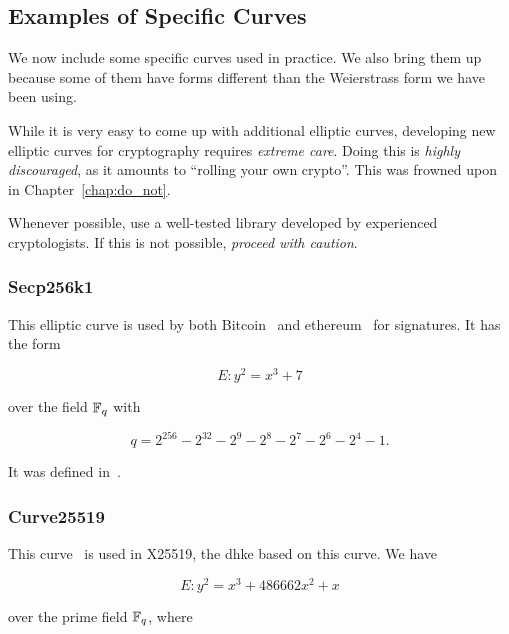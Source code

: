 \subsection{Examples of Specific Curves}
\label{ssec:specific_curves}

We now include some specific curves used in practice.
We also bring them up because some of them have forms different
than the Weierstrass form we have been using.

While it is very easy to come up with additional \glspl{elliptic curve},
developing new \glspl{elliptic curve} for cryptography requires
\emph{extreme care}.
Doing this is \emph{highly discouraged}, as it amounts to
``rolling your own crypto''.
This was frowned upon in Chapter~\ref{chap:do_not}.

Whenever possible, use a well-tested library developed by
experienced cryptologists.
If this is not possible, \emph{proceed with caution}.

\subsubsection{Secp256k1}

This \gls{elliptic curve} is used by both Bitcoin~\cite{BitcoinWhitepaper} and
\gls{ethereum}~\cite[Appendix F]{EthereumYellowpaper}
for \glspl{signature}.
It has the form

\begin{equation}
    E:y^{2} = x^{3} + 7
\end{equation}

\noindent
over the \gls{field} $\mathbb{F}_{q}$ with

\begin{equation}
    q = 2^{256} - 2^{32} - 2^{9} - 2^{8} - 2^{7} - 2^{6} - 2^{4} - 1.
\end{equation}

\noindent
It was defined in~\cite[Section 2.4.1]{brown2010sec2}.

\subsubsection{Curve25519}

This curve~\cite{Curve25519} is used in X25519,
the \gls{dhke} based on this curve.
We have

\begin{equation}
    E:y^{2} = x^{3} + 486662x^{2} + x
\end{equation}

\noindent
over the prime \gls{field} $\mathbb{F}_{q}$,
where

